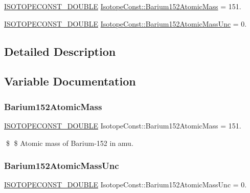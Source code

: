 \begin{DoxyCompactItemize}
\item 
\mbox{\hyperlink{group___isotope_const-_macros_ga8f45a7272ce02c0b4c65c44636ed719a}{I\+S\+O\+T\+O\+P\+E\+C\+O\+N\+S\+T\+\_\+\+D\+O\+U\+B\+LE}} \mbox{\hyperlink{group___isotope_const-_barium-_ba152_ga297cecc9f45d86d2806c569e6797aad9}{Isotope\+Const\+::\+Barium152\+Atomic\+Mass}} = 151.
\item 
\mbox{\hyperlink{group___isotope_const-_macros_ga8f45a7272ce02c0b4c65c44636ed719a}{I\+S\+O\+T\+O\+P\+E\+C\+O\+N\+S\+T\+\_\+\+D\+O\+U\+B\+LE}} \mbox{\hyperlink{group___isotope_const-_barium-_ba152_gaca2bd9ea535c7225114dc097e2465ad8}{Isotope\+Const\+::\+Barium152\+Atomic\+Mass\+Unc}} = 0.
\end{DoxyCompactItemize}


\subsection{Detailed Description}


\subsection{Variable Documentation}
\mbox{\label{group___isotope_const-_barium-_ba152_ga297cecc9f45d86d2806c569e6797aad9}} 
\subsubsection{\texorpdfstring{Barium152\+Atomic\+Mass}{Barium152AtomicMass}}
{\footnotesize\ttfamily \mbox{\hyperlink{group___isotope_const-_macros_ga8f45a7272ce02c0b4c65c44636ed719a}{I\+S\+O\+T\+O\+P\+E\+C\+O\+N\+S\+T\+\_\+\+D\+O\+U\+B\+LE}} Isotope\+Const\+::\+Barium152\+Atomic\+Mass = 151.}

\$ \$ Atomic mass of Barium-\/152 in amu. \mbox{\label{group___isotope_const-_barium-_ba152_gaca2bd9ea535c7225114dc097e2465ad8}} 
\subsubsection{\texorpdfstring{Barium152\+Atomic\+Mass\+Unc}{Barium152AtomicMassUnc}}
{\footnotesize\ttfamily \mbox{\hyperlink{group___isotope_const-_macros_ga8f45a7272ce02c0b4c65c44636ed719a}{I\+S\+O\+T\+O\+P\+E\+C\+O\+N\+S\+T\+\_\+\+D\+O\+U\+B\+LE}} Isotope\+Const\+::\+Barium152\+Atomic\+Mass\+Unc = 0.}

